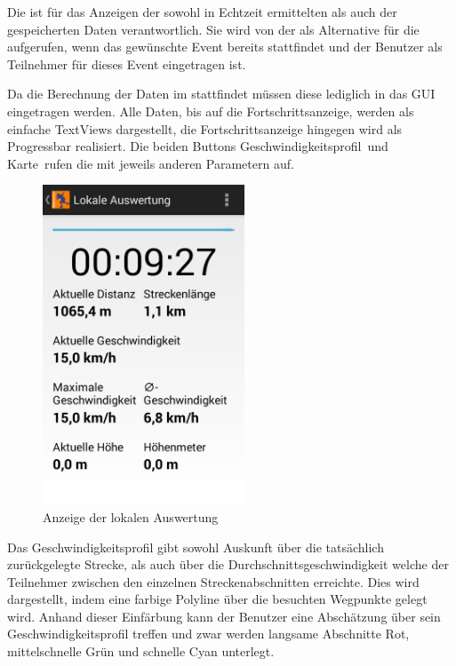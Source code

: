 Die  ist für das Anzeigen der sowohl in Echtzeit ermittelten als auch der gespeicherten Daten verantwortlich. Sie wird von der  als Alternative für die  aufgerufen, wenn das gewünschte Event bereits stattfindet und der Benutzer als Teilnehmer für dieses Event eingetragen ist. 

Da die Berechnung der Daten im   stattfindet müssen diese lediglich in das GUI eingetragen werden. Alle Daten, bis auf die Fortschrittsanzeige, werden als einfache TextViews dargestellt, die Fortschrittsanzeige hingegen wird als Progressbar realisiert. Die beiden Buttons \glqq Geschwindigkeitsprofil\grqq\ und \glqq Karte\grqq\ rufen die  mit jeweils anderen Parametern auf.

\begin{figure}[htb]
\centering
\includegraphics[width=6cm]{graphics/LokaleAuswertung.png}
\caption{Anzeige der lokalen Auswertung}
\label{fig:LokaleAuswertung}
\end{figure}

Das Geschwindigkeitsprofil gibt sowohl Auskunft über die tatsächlich zurückgelegte Strecke, als auch über die Durchschnittsgeschwindigkeit welche der Teilnehmer zwischen den einzelnen Streckenabschnitten erreichte. Dies wird dargestellt, indem eine farbige Polyline über die besuchten Wegpunkte gelegt wird. Anhand dieser Einfärbung kann der Benutzer eine Abschätzung über sein  Geschwindigkeitsprofil treffen und zwar werden langsame Abschnitte Rot, mittelschnelle Grün und schnelle Cyan unterlegt. 

